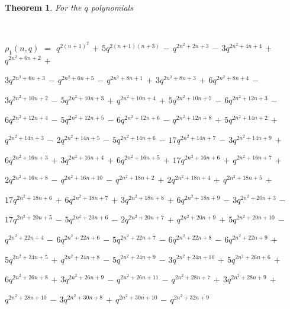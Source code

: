 \documentclass[12pt]{article}
\newtheorem{theorem}{Theorem}
\begin{document}
\begin{theorem}\label{qGuillerasecond}
 For the $q$ polynomials 

 \ 

\noindent $\rho_{1}(n, q)$ $=$ 
 $ q^{2 (n+1)^2} $ $+$ 
 $ 5 q^{2 (n+1) (n+3)}$ $ -$ 
 $q^{2 n^2+2 n+3}$ $-$ 
 $ 3 q^{2 n^2+4 n+4}$ $+$ 
 $ q^{2 n^2+6 n+2}$ $+$ 

\noindent $3 q^{2 n^2+6 n+3}$ $-$ 
 $q^{2 n^2+6 n+5}$ $-$ 
 $q^{2 n^2+8 n+1}$ $+$ 
 $ 3 q^{2 n^2+8 n+3} $ $ + $
 $ 6 q^{2 n^2+8 n+4} $ $ - $ 

\noindent $ 3 q^{2 n^2+10 n+2}$ $ - $ $ 5 q^{2 n^2+10 n+3}$ $ + $ 
 $ q^{2 n^2+10 n+4} $ $ + $ 
 $ 5 q^{2 n^2+10 n+7} $ $ - $ 
 $ 6 q^{2 n^2+12 n+3} $ $ - $ 

\noindent $ 6 q^{2 n^2+12 n+4} $ $ - $
 $ 5 q^{2 n^2+12 n+5}$ $ - $
 $ 6 q^{2 n^2+12 n+6}$ $ - $
 $ q^{2 n^2+12 n+8} $ $ + $
 $ 5 q^{2 n^2+14 n+2} $ $ + $ 

\noindent $ q^{2 n^2+14 n+3} $ $ - $
 $ 2 q^{2 n^2+14 n+5} $ $ - $ 
 $ 5 q^{2 n^2+14 n+6} $ $ - $ 
 $ 17 q^{2 n^2+14 n+7} $ $ - $
 $ 3 q^{2 n^2+14 n+9} $ $ + $
 
\noindent $ 6 q^{2 n^2+16 n+3} $ $+ $ 
 $ 3 q^{2 n^2+16 n+4} $ $+ $
 $ 6 q^{2 n^2+16 n+5}$ $+ $
 $ 17 q^{2 n^2+16 n+6} $ $ + $
 $ q^{2 n^2+16 n+7} $ $ + $ 

\noindent $ 2 q^{2 n^2+16 n+8} $ $ - $ 
 $ q^{2 n^2+16 n+10} $ $ - $
 $ q^{2 n^2+18 n+2} $ $ + $
 $ 2 q^{2 n^2+18 n+4} $ $ + $ 
 $ q^{2 n^2+18 n+5} $ $ + $

\noindent $ 17 q^{2 n^2+18 n+6} $ $ + $ 
 $ 6 q^{2 n^2+18 n+7} $ $ + $
 $ 3 q^{2 n^2+18 n+8} $ $ +$ 
 $ 6 q^{2 n^2+18 n+9} $ $ - $
 $ 3 q^{2 n^2+20 n+3} $ $ - $

\noindent $ 17 q^{2 n^2+20 n+5} $ $ - $
 $ 5 q^{2 n^2+20 n+6} $ $ - $
 $ 2 q^{2 n^2+20 n+7} $ $ + $
 $ q^{2 n^2+20 n+9} $ $ + $
 $ 5 q^{2 n^2+20 n+10} $ $ - $

\noindent $ q^{2 n^2+22 n+4} $ $ - $ 
 $ 6 q^{2 n^2+22 n+6} $ $ - $ 
 $ 5 q^{2 n^2+22 n+7} $ $ - $ 
 $ 6 q^{2 n^2+22 n+8} $ $ - $
 $ 6 q^{2 n^2+22 n+9} $ $ + $

\noindent $ 5 q^{2 n^2+24 n+5} $ $ + $
 $ q^{2 n^2+24 n+8} $ $ - $ 
 $ 5 q^{2 n^2+24 n+9} $ $ - $
 $ 3 q^{2 n^2+24 n+10} $ $ + $
 $ 5 q^{2 n^2+26 n+6} $ $ + $ 

\noindent $ 6 q^{2 n^2+26 n+8} $ $ + $
 $ 3 q^{2 n^2+26 n+9} $ $ - $
 $ q^{2 n^2+26 n+11} $ $ - $
 $ q^{2 n^2+28 n+7} $ $ + $
 $ 3 q^{2 n^2+28 n+9} $ $ + $

\noindent $ q^{2 n^2+28 n+10} $ $ - $
 $ 3 q^{2 n^2+30 n+8} $ $ + $
 $ q^{2 n^2+30 n+10} $ $ - $ 
 $ q^{2 n^2+32 n+9} $


\end{theorem}
\end{document}
